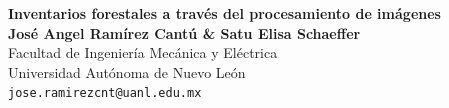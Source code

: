 \documentclass[a0,portrait]{a0poster}
\begin{document}


\begin{minipage}[b]{1\linewidth}
\centering \veryHuge \color{Black} \textbf{Inventarios forestales a través del procesamiento de imágenes}\\ %
\huge \textbf{José Angel Ramírez Cantú \& Satu Elisa Schaeffer}\\[0.5cm] %
\huge Facultad de Ingeniería Mecánica y Eléctrica\\[0.4cm] %
\huge Universidad Autónoma de Nuevo León\\[0.4cm] %
\Large \texttt{jose.ramirezcnt@uanl.edu.mx}\\
\end{minipage}
%
\begin{minipage}[b]{0.25\linewidth}
\end{minipage}

\vspace{1cm} %

\end{document}

